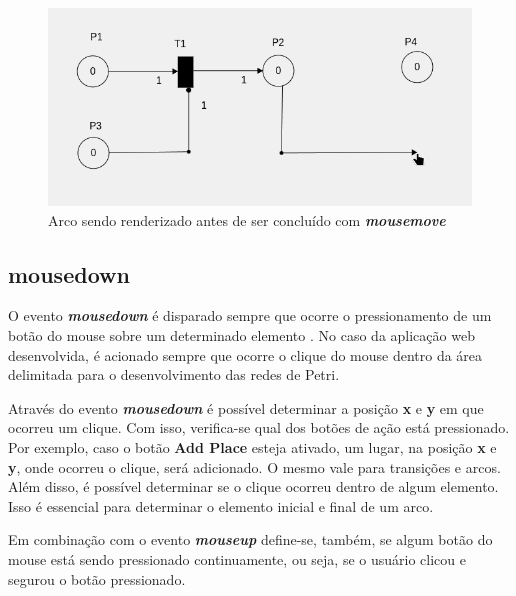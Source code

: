 \documentclass[
	12pt,				%
	openright,			%
	oneside,			%
	a4paper,			%
	english,			%
	brazil				%
	]{abntex2}
\theoremstyle{doispontos}
\begin{document}
\begin{figure}[ht] 
	\centering
	\includegraphics[scale=0.4]{figuras/mousemove_desenhando_arco.png}
	\caption[Mousemove desenhando arco]{Arco sendo renderizado antes de ser concluído com \textbf{\textit{mousemove}}}
	\label{fig:mousemove_desenhando_arco}
\end{figure}
\FloatBarrier

\subsection{mousedown}\label{cap:mousedown}

O evento \textbf{\textit{mousedown}} é disparado sempre que ocorre o pressionamento de um botão do mouse sobre um determinado elemento \textcite{mdn_mousedown_event}. No caso da aplicação web desenvolvida, é acionado sempre que ocorre o clique do mouse dentro da área delimitada para o desenvolvimento das redes de Petri. 



Através do evento \textbf{\textit{mousedown}} é possível determinar a posição \textbf{x} e \textbf{y} em que ocorreu um clique. Com isso, verifica-se qual dos botões de ação está pressionado. Por exemplo, caso o botão \textbf{Add Place} esteja ativado, um lugar, na posição \textbf{x} e \textbf{y}, onde ocorreu o clique, será adicionado. O mesmo vale para transições e arcos. Além disso, é possível determinar se o clique ocorreu dentro de algum elemento. Isso é essencial para determinar o elemento inicial e final de um arco. 

Em combinação com o evento \textbf{\textit{mouseup}} define-se, também, se algum botão do mouse está sendo pressionado continuamente, ou seja, se o usuário clicou e segurou o botão pressionado. 
\end{document}
